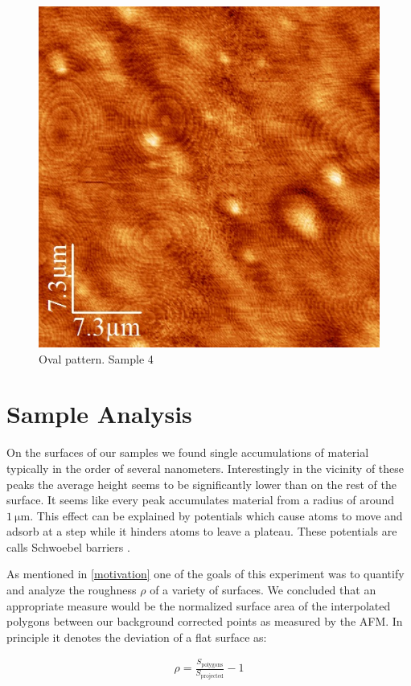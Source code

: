\documentclass[paper=a4,fontsize=10pt,DIV=18,twocolumn,parskip=half]{scrartcl}
\numberwithin{equation}{section}    %
\begin{document}
\begin{figure}
	\begin{center}
		\includegraphics[width=0.7\columnwidth]{Bilder/artifact3}
		\caption{Oval pattern. Sample \textcircled{4}}
		\label{artifact2}
	\end{center}
\end{figure}


\section{Sample Analysis}

On the surfaces of our samples we found single accumulations of material typically in the order of several nanometers. Interestingly in the vicinity of these peaks the average height seems to be significantly lower than on the rest of the surface. It seems like every peak accumulates material from a radius of around $\SI{1}{\micro\meter}$. This effect can be explained by potentials which cause atoms to move and adsorb at a step while it hinders atoms to leave a plateau. These potentials are calls Schwoebel barriers \cite{merikoski}.


As mentioned in \cref{motivation} one of the goals of this experiment was to 
quantify and analyze the roughness $\rho$ of a variety of surfaces. We concluded 
that an appropriate measure would be the normalized surface area of the 
interpolated polygons between our background corrected points as measured by the 
AFM. In principle it denotes the deviation of a flat surface as:

\begin{align}
    \rho = \frac{S_{\text{polygons}}}{S_{\text{projected}}} - 1
\end{align}
\end{document}
